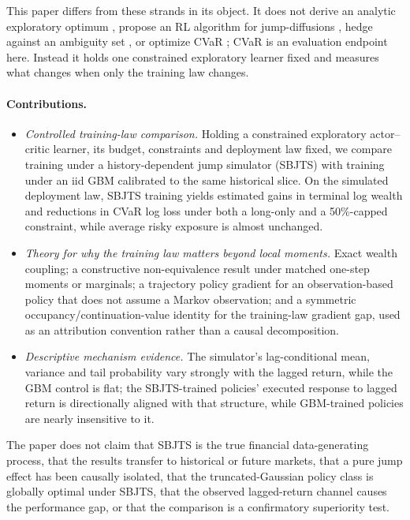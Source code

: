 \documentclass[11pt]{article}
\begin{document}
This paper differs from these strands in its object. It does not derive an analytic exploratory optimum \cite{ChauNguyenNguyen2026,NguyenNkuize2026}, propose an RL algorithm for jump-diffusions \cite{GaoLiZhou2024}, hedge against an ambiguity set \cite{NilimElGhaoui2005,Iyengar2005}, or optimize CVaR \cite{TamarGlassnerMannor2015}; CVaR is an evaluation endpoint here. Instead it holds one constrained exploratory learner fixed and measures what changes when only the training law changes.

\paragraph{Contributions.}
\begin{itemize}[leftmargin=1.5em]
\item \emph{Controlled training-law comparison.} Holding a constrained exploratory actor--critic learner, its budget, constraints and deployment law fixed, we compare training under a history-dependent jump simulator (SBJTS) with training under an iid GBM calibrated to the same historical slice. On the simulated deployment law, SBJTS training yields estimated gains in terminal log wealth and reductions in CVaR log loss under both a long-only and a 50\%-capped constraint, while average risky exposure is almost unchanged.
\item \emph{Theory for why the training law matters beyond local moments.} Exact wealth coupling; a constructive non-equivalence result under matched one-step moments or marginals; a trajectory policy gradient for an observation-based policy that does not assume a Markov observation; and a symmetric occupancy/continuation-value identity for the training-law gradient gap, used as an attribution convention rather than a causal decomposition.
\item \emph{Descriptive mechanism evidence.} The simulator's lag-conditional mean, variance and tail probability vary strongly with the lagged return, while the GBM control is flat; the SBJTS-trained policies' executed response to lagged return is directionally aligned with that structure, while GBM-trained policies are nearly insensitive to it.
\end{itemize}

The paper does not claim that SBJTS is the true financial data-generating process, that the results transfer to historical or future markets, that a pure jump effect has been causally isolated, that the truncated-Gaussian policy class is globally optimal under SBJTS, that the observed lagged-return channel causes the performance gap, or that the comparison is a confirmatory superiority test.
\end{document}
